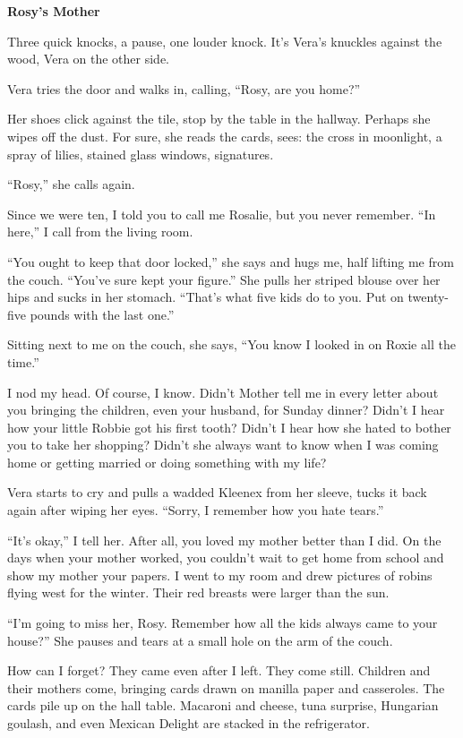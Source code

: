 \documentclass[
]{article}
\begin{document}
\textbf{\hfill\break
}

\textbf{Rosy's Mother}

Three quick knocks, a pause, one louder knock. It's Vera's knuckles
against the wood, Vera on the other side.

Vera tries the door and walks in, calling, ``Rosy, are you home?''

Her shoes click against the tile, stop by the table in the hallway.
Perhaps she wipes off the dust. For sure, she reads the cards, sees: the
cross in moonlight, a spray of lilies, stained glass windows,
signatures.

``Rosy,'' she calls again.

Since we were ten, I told you to call me Rosalie, but you never
remember. ``In here,'' I call from the living room.

``You ought to keep that door locked,'' she says and hugs me, half
lifting me from the couch. ``You've sure kept your figure.'' She pulls
her striped blouse over her hips and sucks in her stomach. ``That's what
five kids do to you. Put on twenty-five pounds with the last one.''

Sitting next to me on the couch, she says, ``You know I looked in on
Roxie all the time.''

I nod my head. Of course, I know. Didn't Mother tell me in every letter
about you bringing the children, even your husband, for Sunday dinner?
Didn't I hear how your little Robbie got his first tooth? Didn't I hear
how she hated to bother you to take her shopping? Didn't she always want
to know when I was coming home or getting married or doing something
with my life?

Vera starts to cry and pulls a wadded Kleenex from her sleeve, tucks it
back again after wiping her eyes. ``Sorry, I remember how you hate
tears.''

``It's okay,'' I tell her. After all, you loved my mother better than I
did. On the days when your mother worked, you couldn't wait to get home
from school and show my mother your papers. I went to my room and drew
pictures of robins flying west for the winter. Their red breasts were
larger than the sun.

``I'm going to miss her, Rosy. Remember how all the kids always came to
your house?'' She pauses and tears at a small hole on the arm of the
couch.

How can I forget? They came even after I left. They come still. Children
and their mothers come, bringing cards drawn on manilla paper and
casseroles. The cards pile up on the hall table. Macaroni and cheese,
tuna surprise, Hungarian goulash, and even Mexican Delight are stacked
in the refrigerator.
\end{document}
